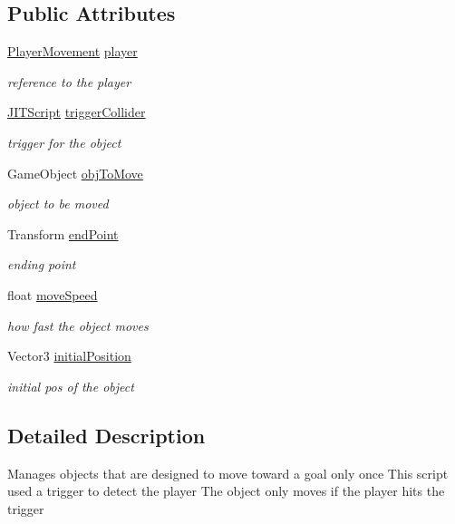 \subsection*{Public Attributes}
\begin{DoxyCompactItemize}
\item 
\hyperlink{class_player_movement}{Player\+Movement} \hyperlink{class_one_way_moving_object_trigger_a50456b25de1017bd53ae8950dff38148}{player}
\begin{DoxyCompactList}\small\item\em reference to the player \end{DoxyCompactList}\item 
\hyperlink{class_j_i_t_script}{J\+I\+T\+Script} \hyperlink{class_one_way_moving_object_trigger_a826ac8904700117919e40f3954901ba6}{trigger\+Collider}
\begin{DoxyCompactList}\small\item\em trigger for the object \end{DoxyCompactList}\item 
Game\+Object \hyperlink{class_one_way_moving_object_trigger_a06663ffd79fa0ce74d186b0795d6b01b}{obj\+To\+Move}
\begin{DoxyCompactList}\small\item\em object to be moved \end{DoxyCompactList}\item 
Transform \hyperlink{class_one_way_moving_object_trigger_adee5de068d168a1b99fcf1f7e479150b}{end\+Point}
\begin{DoxyCompactList}\small\item\em ending point \end{DoxyCompactList}\item 
float \hyperlink{class_one_way_moving_object_trigger_a6da43dfdc11bf6498791d5a38e40722c}{move\+Speed}
\begin{DoxyCompactList}\small\item\em how fast the object moves \end{DoxyCompactList}\item 
Vector3 \hyperlink{class_one_way_moving_object_trigger_a86013b9388d8c1e3a88fd0fd2e8c6176}{initial\+Position}
\begin{DoxyCompactList}\small\item\em initial pos of the object \end{DoxyCompactList}\end{DoxyCompactItemize}


\subsection{Detailed Description}
Manages objects that are designed to move toward a goal only once This script used a trigger to detect the player The object only moves if the player hits the trigger 

